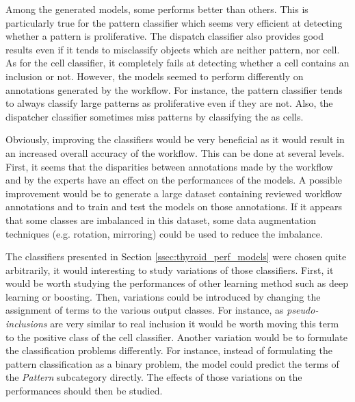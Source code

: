 Among the generated models, some performs better than others. This is particularly true for the pattern classifier which seems very efficient at detecting whether a pattern is proliferative. The dispatch classifier also provides good results even if it tends to misclassify objects which are neither pattern, nor cell. As for the cell classifier, it completely fails at detecting whether a cell contains an inclusion or not. However, the models seemed to perform differently on annotations generated by the workflow. For instance, the pattern classifier tends to always classify large patterns as proliferative even if they are not. Also, the dispatcher classifier sometimes miss patterns by classifying the as cells. 

Obviously, improving the classifiers would be very beneficial as it would result in an increased overall accuracy of the workflow. This can be done at several levels. First, it seems that the disparities between annotations made by the workflow and by the experts have an effect on the performances of the models. A possible improvement would be to generate a large dataset containing reviewed workflow annotations and to train and test the models on those annotations.  If it appears that some classes are imbalanced in this dataset, some data augmentation techniques (e.g. rotation, mirroring) could be used to reduce the imbalance.  

The classifiers presented in Section \ref{ssec:thyroid_perf_models} were chosen quite arbitrarily, it would interesting to study variations of those classifiers. First, it would be worth studying the performances of other learning method such as deep learning or boosting. Then, variations could be introduced by changing the assignment of terms to the various output classes. For instance, as \textit{pseudo-inclusions} are very similar to real inclusion it would be worth moving this term to the positive class of the cell classifier. Another variation would be to formulate the classification problems differently. For instance, instead of formulating the pattern classification as a binary problem, the model could predict the terms of the \textit{Pattern} subcategory directly. The effects of those variations on the performances should then be studied. 


 
